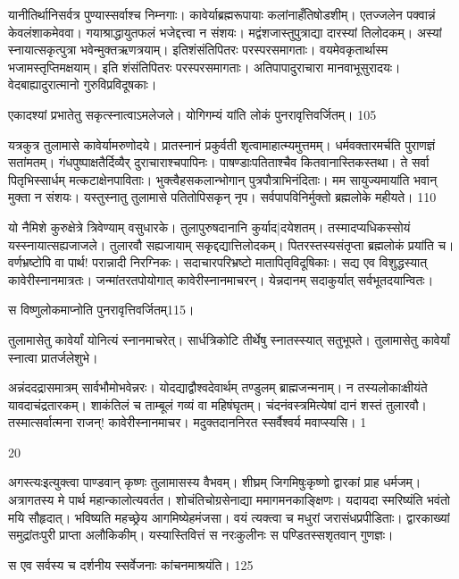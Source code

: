 यानीतिर्थानिसर्वत्र पुण्यास्सर्वाश्च निम्नगाः।
कावेर्याब्रह्मरूपायाः कलांनाहँतिषोडशीम्।
एतज्जलेन पक्वान्नं केवलंशाकमेववा।
गयाश्राद्धायुतफलं भजेद्दत्त्वा न संशयः।
मद्वंशजास्तुपुत्राद्या दारस्यां तिलोदकम्।
अस्यां स्नायात्सकृत्पुत्रा भवेन्मुक्तऋणत्रयाम्।
इतिशंसंतिपितरः परस्परसमागताः।
वयमेवकृतार्थास्म भजामस्तृप्तिमक्षयाम्।
इति शंसंतिपितरः परस्परसमागताः।
अतिपापादुराचारा मानवाभूसुरादयः।
वेदबाह्यादुरात्मानो गुरुविप्रविदूषकाः।

एकादश्यां प्रभातेतु सकृत्स्नात्वाऽमलेजले।
योगिगम्यं यांति लोकं पुनरावृत्तिवर्जितम्।
105

यत्रकुत्र तुलामासे कावेर्यामरुणोदये।
प्रातस्नानं प्रकुर्वती शृत्वामाहात्म्यमुत्तमम्।
धर्मवक्तारमर्चति पुराणज्ञं सतांमतम्।
गंधपुष्पाक्षतैर्दिव्यैर् दुराचाराश्चपापिनः।
पाषण्डाःपतिताश्चैव कितवानास्तिकस्तथा।
ते सर्वा पितृभिस्सार्धम् मत्कटाक्षेनपाविताः।
भुक्त्वैहसकलान्भोगान् पुत्रपौत्राभिनंदिताः।
मम सायुज्यमायांति भवान् मुक्ता न संशयः।
यस्तुस्नातु तुलामासे पतितोपिसकृन् नृप।
सर्वपापविनिर्मुक्तो ब्रह्मलोके महीयते।
110

यो नैमिशे कुरुक्षेत्रे त्रिवेण्याम् वसुधारके।
तुलापुरुषदानानि कुर्याद|दयेशतम्।
तस्मादप्यधिकस्सोयं यस्स्नायात्सह्यजाजले।
तुलारवौ सह्यजायाम् सकृद्दद्यात्तिलोदकम्।
पितरस्तस्यसंतृप्ता ब्रह्मलोकं प्रयांति च।
वर्णभ्रष्टोपि वा पार्थ! परान्नादी निरग्निकः।
सदाचारपरिभ्रष्टो मातापितृविदूषिकाः।
सद्य एव विशुद्धस्यात् कावेरीस्नानमात्रतः।
जन्मांतरतपोयोगात् कावेरीस्नानमाचरन्।
येन्नदानम् सदाकुर्यात् सर्वभूतदयान्वितः।

स विष्णुलोकमाप्नोति पुनरावृत्तिवर्जितम्115।


तुलामासेतु कावेर्यां योनित्यं स्नानमाचरेत्।
सार्धत्रिकोटि तीर्थेषु स्नातस्स्यात् सतुभूपते।
तुलामासेतु कावेर्यां स्नात्वा प्रातर्जलेशुभे।

अन्नंददद्रासमात्रम् सार्वभौमोभवेन्नरः।
योदद्याद्वौश्वदेवार्थम् तण्डुलम् ब्राह्मजन्मनाम्।
न तस्यलोकाःक्षीयंते यावदाचंद्रतारकम्।
शाकंतिलं च ताम्बूलं गव्यं वा महिषंघृतम्।
चंदनंवस्त्रमित्येषां दानं शस्तं तुलारवौ।
तस्मात्सर्वात्मना राजन्! कावेरीस्नानमाचर।
मदुक्तदाननिरत स्सर्वैश्वर्य मवाप्स्यसि।
1

20

अगस्त्यःइत्युक्त्वा पाण्डवान् कृष्णः तुलामासस्य वैभवम्।
शीघ्रम् जिगमिषुःकृष्णो द्वारकां प्राह धर्मजम्।
अत्रागतस्य मे पार्थ महान्कालोत्यवर्तत।
शोचंतिचोग्रसेनाद्या ममागमनकाङ्क्षिणः।
यदायदा स्मरिष्यंति भवंतो मयि सौहृदात्।
भविष्यति महच्छ्रेय आगमिष्येहमंजसा।
वयं त्यक्त्वा च मधुरां जरासंधप्रपीडिताः।
द्वारकाख्यां समुद्रांतःपुरी प्राप्ता अलौकिकीम्।
यस्यास्तिवित्तं स नरःकुलीनः
स पण्डितस्सशृतवान् गुणज्ञः।

स एव सर्वस्य च दर्शनीय
स्सर्वेजनाः कांचनमाश्रयंति।
125


